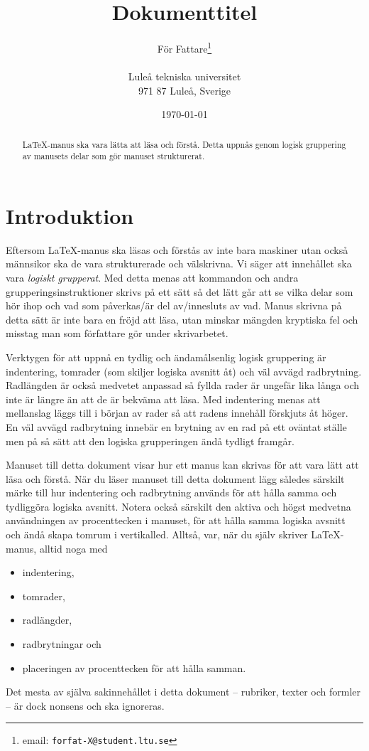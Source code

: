 \documentclass[a4paper,12pt]{article}
\title{Dokumenttitel}
\author{För Fattare\thanks{email: \texttt{forfat-X@student.ltu.se}} \\  
        ~ \\
        Luleå tekniska universitet \\ 
        971 87 Luleå, Sverige}
\date{\today}
\begin{document}
\linenumbers


\maketitle


\begin{abstract}
  \LaTeX-manus ska vara lätta att läsa och förstå. Detta uppnås genom
  logisk gruppering av manusets delar som gör manuset
  strukturerat. 
\end{abstract}


\section{Introduktion}


Eftersom \LaTeX-manus ska läsas och förstås av inte bara maskiner utan
också männsikor ska de vara strukturerade och välskrivna. Vi säger att
innehållet ska vara \emph{logiskt grupperat}. Med detta menas att
kommandon och andra grupperingsinstruktioner skrivs på ett sätt så det
lätt går att se vilka delar som hör ihop och vad som påverkas/är del
av/innesluts av vad. Manus skrivna på detta sätt är inte bara en fröjd
att läsa, utan minskar mängden kryptiska fel och misstag man som
författare gör under skrivarbetet. 


Verktygen för att uppnå en tydlig och ändamålsenlig logisk gruppering
är indentering, tomrader (som skiljer logiska avsnitt åt) och väl
avvägd radbrytning. Radlängden är också medvetet anpassad så fyllda
rader är ungefär lika långa och inte är längre än att de är bekväma
att läsa. Med indentering menas att mellanslag läggs till i början av
rader så att radens innehåll förskjuts åt höger. En väl avvägd
radbrytning innebär en brytning av en rad på ett oväntat ställe men på
så sätt att den logiska grupperingen ändå tydligt framgår. 


Manuset till detta dokument visar hur ett manus kan skrivas för att
vara lätt att läsa och förstå. När du läser manuset till detta
dokument lägg således särskilt märke till hur indentering och
radbrytning används för att hålla samma och tydliggöra logiska
avsnitt. Notera också särskilt den aktiva och högst medvetna
användningen av procenttecken i manuset, för att hålla samma logiska
avsnitt och ändå skapa tomrum i vertikalled. Alltså, var, när du själv
skriver \LaTeX-manus, alltid noga med
%
\begin{itemize}
%
  \item indentering,
%
  \item tomrader,
%
  \item radlängder,
%
  \item radbrytningar och
%
  \item placeringen av procenttecken för att hålla samman. 
%
  \end{itemize}
%
Det mesta av själva sakinnehållet i detta dokument -- rubriker, texter 
och formler -- är dock nonsens och ska ignoreras.
\end{document}
